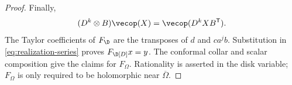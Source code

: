 \begin{proof}
Finally,
\[
 (D^k\otimes B)\vecop(X)=\vecop(D^kXB^{\mathsf T}).
\]
The Taylor coefficients of $F_\D$ are the transposes of $d$ and
$ca^jb$. Substitution in \eqref{eq:realization-series} proves
$F_\D[D]x=y$. The conformal collar and scalar composition give the
claims for $F_\Omega$. Rationality is asserted in the disk variable;
$F_\Omega$ is only required to be holomorphic near $\overline\Omega$.
\end{proof}

